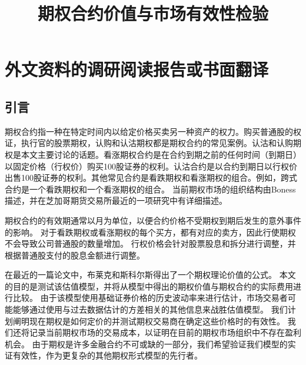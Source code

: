 \chapter{外文资料的调研阅读报告或书面翻译}
\title{期权合约价值与市场有效性检验}
\section{引言}
\par{期权合约指一种在特定时间内以给定价格买卖另一种资产的权力。购买普通股的权证，执行官的股票期权，认购和认沽期权都是期权合约的常见案例。认沽和认购期权是本文主要讨论的话题。看涨期权合约是在合约到期之前的任何时间（到期日）以固定价格（行权价）购买100股证券的权利。认沽合约是以合约到期日以行权价出售100股证券的权利。其他常见合约是看跌期权和看涨期权的组合。例如，跨式合约是一个看跌期权和一个看涨期权的组合。
当前期权市场的组织结构由Boness描述，并在芝加哥期货交易所最近的一项研究中有详细描述。}

\par{期权合约的有效期通常以月为单位，以便合约价格不受期权到期后发生的意外事件的影响。 对于看跌期权或看涨期权的每个买方，都有对应的卖方，因此行使期权不会导致公司普通股的数量增加。 行权价格会针对股票股息和拆分进行调整，并根据普通股支付的股息金额进行调整。}
\par{
在最近的一篇论文中，布莱克和斯科尔斯得出了一个期权理论价值的公式。 本文的目的是测试该估值模型，并将从模型中得出的期权价值与期权合约的实际费用进行比较。 由于该模型使用基础证券价格的历史波动率来进行估计，市场交易者可能能够通过使用与过去数据估计的方差相关的其他信息来战胜估值模型。 我们计划阐明现在期权是如何定价的并测试期权交易商在确定这些价格时的有效性。 我们还将记录当前期权市场的交易成本，以证明在目前的期权市场组织中不存在盈利机会。 由于期权是许多金融合约不可或缺的一部分，我们希望验证我们模型的实证有效性，作为更复杂的其他期权形式模型的先行者。}

